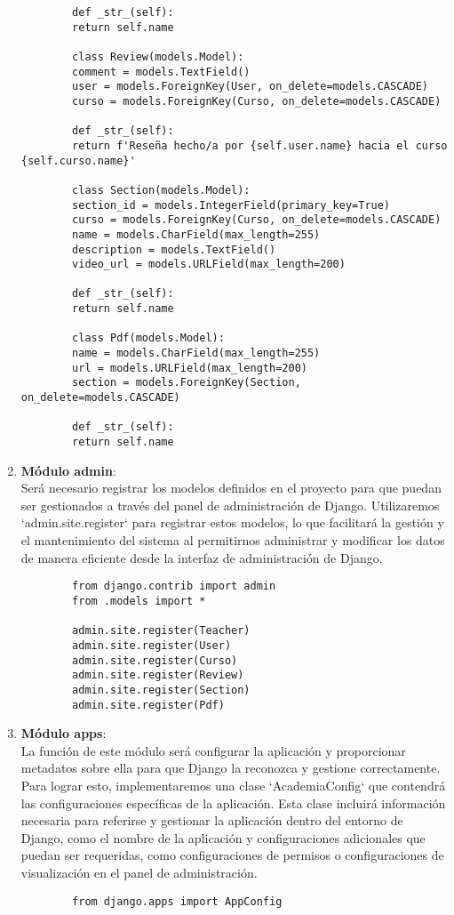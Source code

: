 \begin{enumerate}
\begin{verbatim}
		def _str_(self):
		return self.name
		
		class Review(models.Model):
		comment = models.TextField()
		user = models.ForeignKey(User, on_delete=models.CASCADE)
		curso = models.ForeignKey(Curso, on_delete=models.CASCADE)
		
		def _str_(self):
		return f'Reseña hecho/a por {self.user.name} hacia el curso {self.curso.name}'
		
		class Section(models.Model):
		section_id = models.IntegerField(primary_key=True)
		curso = models.ForeignKey(Curso, on_delete=models.CASCADE)
		name = models.CharField(max_length=255)
		description = models.TextField()
		video_url = models.URLField(max_length=200)
		
		def _str_(self):
		return self.name
		
		class Pdf(models.Model):
		name = models.CharField(max_length=255)
		url = models.URLField(max_length=200)
		section = models.ForeignKey(Section, on_delete=models.CASCADE)
		
		def _str_(self):
		return self.name
	\end{verbatim}
	\item \textbf{Módulo admin}: \\
	Será necesario registrar los modelos definidos en el proyecto para que puedan ser gestionados a través del panel de administración de Django. Utilizaremos `admin.site.register` para registrar estos modelos, lo que facilitará la gestión y el mantenimiento del sistema al permitirnos administrar y modificar los datos de manera eficiente desde la interfaz de administración de Django.
	\begin{verbatim}
		from django.contrib import admin
		from .models import *
		
		admin.site.register(Teacher)
		admin.site.register(User)
		admin.site.register(Curso)
		admin.site.register(Review)
		admin.site.register(Section)
		admin.site.register(Pdf)
	\end{verbatim}
	\item \textbf{Módulo apps}: \\
	La función de este módulo será configurar la aplicación y proporcionar metadatos sobre ella para que Django la reconozca y gestione correctamente. Para lograr esto, implementaremos una clase `AcademiaConfig` que contendrá las configuraciones específicas de la aplicación. Esta clase incluirá información necesaria para referirse y gestionar la aplicación dentro del entorno de Django, como el nombre de la aplicación y configuraciones adicionales que puedan ser requeridas, como configuraciones de permisos o configuraciones de visualización en el panel de administración.
	\begin{verbatim}
		from django.apps import AppConfig
		

\end{verbatim}
\end{enumerate}

